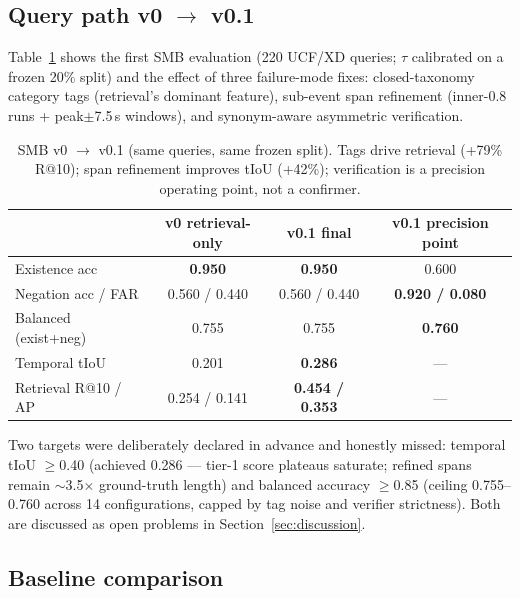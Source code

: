 \subsection{Query path v0 $\rightarrow$ v0.1}
\label{sec:exp-v01}

Table~\ref{tab:v01} shows the first SMB evaluation (220 UCF/XD queries; $\tau$ calibrated on a frozen 20\% split) and the effect of three failure-mode fixes: closed-taxonomy category tags (retrieval's dominant feature), sub-event span refinement (inner-0.8 runs + peak$\pm$7.5\,s windows), and synonym-aware asymmetric verification.

\begin{table}[h]
\centering
\caption{SMB v0 $\rightarrow$ v0.1 (same queries, same frozen split). Tags drive retrieval (+79\% R@10); span refinement improves tIoU (+42\%); verification is a precision operating point, not a confirmer.}
\label{tab:v01}
\small
\begin{tabular}{@{}lccc@{}}
\toprule
 & v0 retrieval-only & v0.1 final & v0.1 precision point \\
\midrule
Existence acc & \textbf{0.950} & \textbf{0.950} & 0.600 \\
Negation acc / FAR & 0.560 / 0.440 & 0.560 / 0.440 & \textbf{0.920 / 0.080} \\
Balanced (exist+neg) & 0.755 & 0.755 & \textbf{0.760} \\
Temporal tIoU & 0.201 & \textbf{0.286} & --- \\
Retrieval R@10 / AP & 0.254 / 0.141 & \textbf{0.454 / 0.353} & --- \\
\bottomrule
\end{tabular}
\end{table}

Two targets were deliberately declared in advance and honestly missed: temporal tIoU $\ge$0.40 (achieved 0.286 --- tier-1 score plateaus saturate; refined spans remain $\sim$3.5$\times$ ground-truth length) and balanced accuracy $\ge$0.85 (ceiling 0.755--0.760 across 14 configurations, capped by tag noise and verifier strictness). Both are discussed as open problems in Section~\ref{sec:discussion}.

\subsection{Baseline comparison}
\label{sec:exp-baselines}

